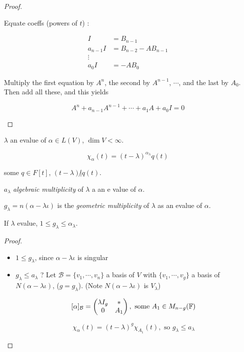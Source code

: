 \documentclass[a4paper]{article}
\begin{document}
\begin{proof}
\begin{itemize}
		
		Equate coeffs (powers of $ t $) :
		
		
		\begin{align*}
		I & = B_{n-1} \\
		a_{n-1} I & = B_{n-2} - A B_{n-1} \\
		\vdots \\
		a_{0}I & = - A B_{0} 
		\end{align*}
		
		
		Multiply the first equation by $ A^{n} $, the second by $ A^{n-1} $, $ \cdots $, and the last by $ A_{0} $. Then add all these, and this yields
		
		\[  A^{n} + a_{n-1} A^{n-1} + \cdots + a_{1} A + a_{0} I = 0  \]
		
		
		
	\end{itemize}
\end{proof}


\begin{defi}
	$ \lambda $ an evalue of $ \alpha \in L(V) $, $ \dim V < \infty $. 
	
	\[ \chi_{\alpha}(t) = (t - \lambda )^{\alpha_{\lambda}} q(t)  \]
	
	
	some $ q \in F[t] $, $ (t - \lambda) \not | q(t) $.
	 
	$ a_{\lambda} $ \emph{algebraic multiplicity} of $ \lambda $ a an e value of $ \alpha $.
	
	
	$ g_{\lambda} = n(\alpha - \lambda \iota) $ is the \emph{geometric multiplicity} of $ \lambda $ as an evalue of $ \alpha $. 
\end{defi}


\begin{lemma} If $ \lambda $ evalue, $ 1 \leq g_{\lambda} \leq \alpha_{\lambda} $. 
	
\end{lemma}

\begin{proof}
	\begin{itemize}
		\item $ 1 \leq g_{\lambda} $, since $ \alpha- \lambda \iota $ is singular
		
		\item $ g_{\lambda} \leq a_{\lambda} $ ? Let $ \mathcal{B} = \{ v_{1},\cdots,v_{n} \} $ a basis of $ V $ with $ \{  v_{1},\cdots,v_{g} \} $ a basis of $ N(\alpha - \lambda \iota) $, ($ g = g_{\lambda} $). (Note $ N(\alpha - \lambda \iota) $ is $ V_{\lambda} $)
		
		\[ [\alpha]_{\mathcal{B}} = \begin{pmatrix}
		\lambda I_{g} & * \\
		0 & A_{1}
		\end{pmatrix}, \text{ some } A_{1} \in M_{n-g}(\mathbb{F}) \]
		
		
		
		\[ \chi_{\alpha}(t) = (t - \lambda)^{g}  \chi_{A_{1}}(t), \text{ so } g_{\lambda} \leq a_{\lambda}   \]
		
		
	\end{itemize}
	
	
\end{proof}
\end{document}
